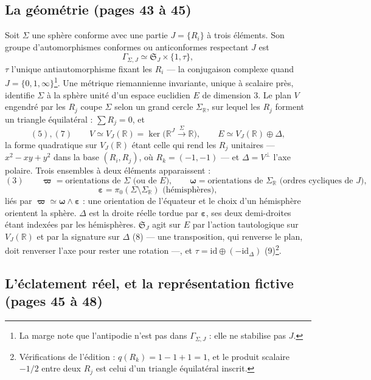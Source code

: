 \documentclass[11pt,a4paper]{article}
\begin{document}
\subsection*{La géométrie (pages 43 à 45)}

Soit $\Sigma$ une sphère conforme avec une partie $J = \{R_i\}$ à trois
éléments. Son groupe d'automorphismes conformes ou anticonformes respectant $J$
est
\[
\Gamma_{\Sigma, J} \simeq \mathfrak{S}_J \times \{1, \tau\},
\]
$\tau$ l'unique antiautomorphisme fixant les $R_i$ — la conjugaison complexe
quand $J = \{0, 1, \infty\}$\footnote{La marge note que l'antipodie n'est pas
dans $\Gamma_{\Sigma,J}$ : elle ne stabilise pas $J$.}. Une métrique
riemannienne invariante, unique à scalaire près, identifie $\Sigma$ à la sphère
unité d'un espace euclidien $E$ de dimension $3$. Le plan $V$ engendré par les
$R_j$ coupe $\Sigma$ selon un grand cercle $\Sigma_{\mathbb{R}}$, sur lequel les
$R_j$ forment un triangle équilatéral : $\sum R_j = 0$, et
\[
(5),(7)\qquad V \simeq V_J(\mathbb{R}) = \ker\bigl(\mathbb{R}^J \xrightarrow{\ \Sigma\ } \mathbb{R}\bigr), \qquad
E \simeq V_J(\mathbb{R}) \oplus \Delta ,
\]
la forme quadratique sur $V_J(\mathbb{R})$ étant celle qui rend les $R_j$
unitaires — $x^2 - xy + y^2$ dans la base $(R_i, R_j)$, où
$R_k = (-1, -1)$ — et $\Delta = V^{\perp}$ l'axe polaire. Trois ensembles à
deux éléments apparaissent :
\[
(3)\qquad \boldsymbol{\varpi} = \text{orientations de } \Sigma \text{ (ou de } E), \qquad
\boldsymbol{\omega} = \text{orientations de } \Sigma_{\mathbb{R}} \text{ (ordres cycliques de } J),
\]
\[
\boldsymbol{\varepsilon} = \pi_0(\Sigma \setminus \Sigma_{\mathbb{R}}) \text{ (hémisphères)},
\]
liés par $\boldsymbol{\varpi} \simeq \boldsymbol{\omega} \wedge
\boldsymbol{\varepsilon}$ : une orientation de l'équateur et le choix d'un
hémisphère orientent la sphère. $\Delta$ est la droite réelle tordue par
$\boldsymbol{\varepsilon}$, ses deux demi-droites étant indexées par les
hémisphères. $\mathfrak{S}_J$ agit sur $E$ par l'action tautologique sur
$V_J(\mathbb{R})$ et par la signature sur $\Delta$ (8) — une transposition, qui
renverse le plan, doit renverser l'axe pour rester une rotation —, et
$\tau = \mathrm{id} \oplus (-\mathrm{id}_\Delta)$ (9)\footnote{Vérifications de
l'édition : $q(R_k) = 1 - 1 + 1 = 1$, et le produit scalaire $-1/2$ entre deux
$R_j$ est celui d'un triangle équilatéral inscrit.}.

\subsection*{L'éclatement réel, et la représentation fictive (pages 45 à 48)}
\end{document}
